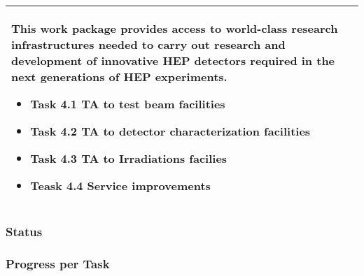 \begin{table}[H]
\begin{tabular}{|p{}|}
        \rowcolor{white} 
        \hspace*{-0.75cm} 
        \begin{minipage}[t]{\textwidth}
        {\leftskip=15pt
        This work package provides access to world-class research infrastructures needed to carry out research and development of innovative HEP detectors required in the next generations of HEP experiments.
    		\begin{itemize}
    		    \item Task 4.1 TA to test beam facilities 
    			\item Task 4.2 TA to detector characterization facilities
			    \item Task 4.3 TA to Irradiations facilies
                    \item Teask 4.4 Service improvements
    		\end{itemize} 
    		\vspace*{0.10em}
        }
	\end{minipage}        
        \\
        \hline
    \end{tabular}
    \vspace{0.5em}\vfill
\end{table}
\subsubsection*{Status}


\subsubsection*{Progress per Task}

